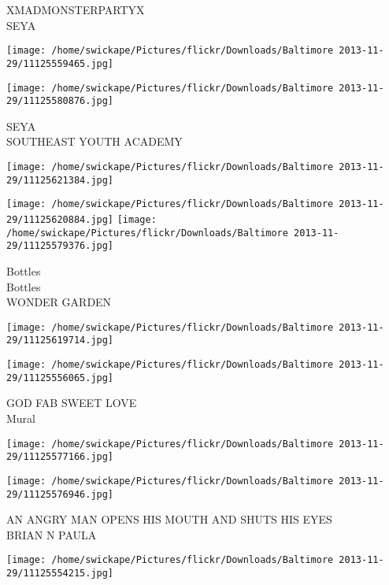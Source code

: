 \documentclass[10pt,letterpaper]{article}
\begin{document}
XMADMONSTERPARTYX\\
SEYA\\
\pagebreak

\texttt{[image: /home/swickape/Pictures/flickr/Downloads/Baltimore 2013-11-29/11125559465.jpg]}

\vspace{0.25in}
\texttt{[image: /home/swickape/Pictures/flickr/Downloads/Baltimore 2013-11-29/11125580876.jpg]}

SEYA\\
SOUTHEAST YOUTH ACADEMY\\
\pagebreak

\texttt{[image: /home/swickape/Pictures/flickr/Downloads/Baltimore 2013-11-29/11125621384.jpg]}

\vspace{0.25in}
\texttt{[image: /home/swickape/Pictures/flickr/Downloads/Baltimore 2013-11-29/11125620884.jpg]}
\texttt{[image: /home/swickape/Pictures/flickr/Downloads/Baltimore 2013-11-29/11125579376.jpg]}

Bottles\\
Bottles\\
WONDER GARDEN\\
\pagebreak

\texttt{[image: /home/swickape/Pictures/flickr/Downloads/Baltimore 2013-11-29/11125619714.jpg]}

\vspace{0.25in}
\texttt{[image: /home/swickape/Pictures/flickr/Downloads/Baltimore 2013-11-29/11125556065.jpg]}

GOD FAB SWEET LOVE\\
Mural\\
\pagebreak

\texttt{[image: /home/swickape/Pictures/flickr/Downloads/Baltimore 2013-11-29/11125577166.jpg]}

\vspace{0.25in}
\texttt{[image: /home/swickape/Pictures/flickr/Downloads/Baltimore 2013-11-29/11125576946.jpg]}

AN ANGRY MAN OPENS HIS MOUTH AND SHUTS HIS EYES\\
BRIAN N PAULA\\
\pagebreak

\texttt{[image: /home/swickape/Pictures/flickr/Downloads/Baltimore 2013-11-29/11125554215.jpg]}
\end{document}
